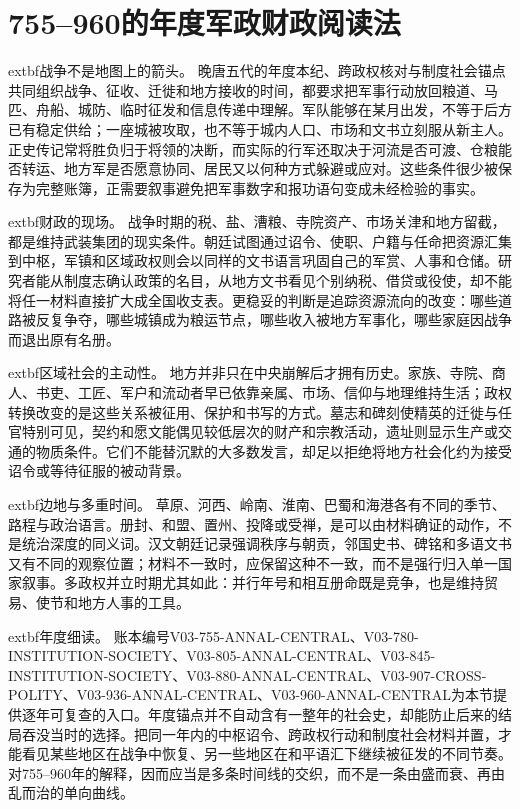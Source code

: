 \section{755--960的年度军政财政阅读法}
\label{sec:annual-military-fiscal-chronology}

\noindent	extbf{战争不是地图上的箭头。} 晚唐五代的年度本纪、跨政权核对与制度社会锚点共同组织战争、征收、迁徙和地方接收的时间，都要求把军事行动放回粮道、马匹、舟船、城防、临时征发和信息传递中理解。军队能够在某月出发，不等于后方已有稳定供给；一座城被攻取，也不等于城内人口、市场和文书立刻服从新主人。正史传记常将胜负归于将领的决断，而实际的行军还取决于河流是否可渡、仓粮能否转运、地方军是否愿意协同、居民又以何种方式躲避或应对。这些条件很少被保存为完整账簿，正需要叙事避免把军事数字和报功语句变成未经检验的事实。

\noindent	extbf{财政的现场。} 战争时期的税、盐、漕粮、寺院资产、市场关津和地方留截，都是维持武装集团的现实条件。朝廷试图通过诏令、使职、户籍与任命把资源汇集到中枢，军镇和区域政权则会以同样的文书语言巩固自己的军赏、人事和仓储。研究者能从制度志确认政策的名目，从地方文书看见个别纳税、借贷或役使，却不能将任一材料直接扩大成全国收支表。更稳妥的判断是追踪资源流向的改变：哪些道路被反复争夺，哪些城镇成为粮运节点，哪些收入被地方军事化，哪些家庭因战争而退出原有名册。

\noindent	extbf{区域社会的主动性。} 地方并非只在中央崩解后才拥有历史。家族、寺院、商人、书吏、工匠、军户和流动者早已依靠亲属、市场、信仰与地理维持生活；政权转换改变的是这些关系被征用、保护和书写的方式。墓志和碑刻使精英的迁徙与任官特别可见，契约和愿文能偶见较低层次的财产和宗教活动，遗址则显示生产或交通的物质条件。它们不能替沉默的大多数发言，却足以拒绝将地方社会化约为接受诏令或等待征服的被动背景。

\noindent	extbf{边地与多重时间。} 草原、河西、岭南、淮南、巴蜀和海港各有不同的季节、路程与政治语言。册封、和盟、置州、投降或受禅，是可以由材料确证的动作，不是统治深度的同义词。汉文朝廷记录强调秩序与朝贡，邻国史书、碑铭和多语文书又有不同的观察位置；材料不一致时，应保留这种不一致，而不是强行归入单一国家叙事。多政权并立时期尤其如此：并行年号和相互册命既是竞争，也是维持贸易、使节和地方人事的工具。

\noindent	extbf{年度细读。} 账本编号V03-755-ANNAL-CENTRAL、V03-780-INSTITUTION-SOCIETY、V03-805-ANNAL-CENTRAL、V03-845-INSTITUTION-SOCIETY、V03-880-ANNAL-CENTRAL、V03-907-CROSS-POLITY、V03-936-ANNAL-CENTRAL、V03-960-ANNAL-CENTRAL为本节提供逐年可复查的入口。年度锚点并不自动含有一整年的社会史，却能防止后来的结局吞没当时的选择。把同一年内的中枢诏令、跨政权行动和制度社会材料并置，才能看见某些地区在战争中恢复、另一些地区在和平语汇下继续被征发的不同节奏。对755--960年的解释，因而应当是多条时间线的交织，而不是一条由盛而衰、再由乱而治的单向曲线。

